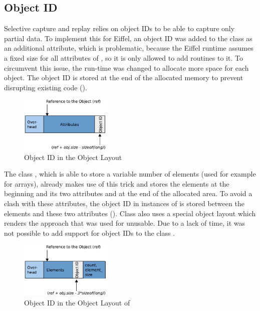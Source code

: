 \subsection{Object ID}
Selective capture and replay relies on object IDs to be able to capture only partial data. To implement this for Eiffel, an object ID was added to the class  as an additional attribute, which is problematic, because the Eiffel runtime assumes a fixed size for all attributes of , so it is only allowed to add routines to it. To circumvent this issue, the run-time was  changed to allocate more space for each object. The object ID is stored at the end of the allocated memory to prevent disrupting existing code ().
\begin{figure}[ht]
  \centering
  \includegraphics[width=0.4\textwidth]{illustrations/any_object_id}
  \caption{Object ID in the Object Layout}
  \label{fig:any_object_id}
\end{figure}

The class , which is able to store a variable number of elements (used for example for arrays), already makes use of this trick and stores the elements at the beginning and its two attributes  and  at the end of the allocated area. To avoid a clash with these attributes, the object ID in instances of  is stored between the elements and these two attributes (). Class  also uses a special object layout which renders the approach that was used for  unusable. Due to a lack of time, it was not possible to add support for object IDs to the class .
\begin{figure}[ht]
  \centering
  \includegraphics[width=0.4\textwidth]{illustrations/special_object_id}
  \caption{Object ID in the Object Layout of }
  \label{fig:special_object_id}
\end{figure}

